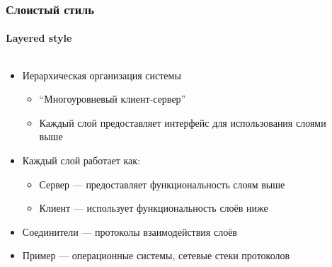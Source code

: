 \documentclass[xetex,mathserif,serif]{beamer}
\begin{document}
    \begin{frame}
        \frametitle{Слоистый стиль}
        \framesubtitle{Layered style}
        \begin{columns}
            \begin{column}{0.85\textwidth}
                \begin{itemize}
                    \item Иерархическая организация системы
                    \begin{itemize}
                        \item ``Многоуровневый клиент-сервер''
                        \item Каждый слой предоставляет интерфейс для использования слоями выше
                    \end{itemize}
                    \item Каждый слой работает как:
                    \begin{itemize}
                        \item Сервер --- предоставляет функциональность слоям выше
                        \item Клиент --- использует функциональность слоёв ниже
                    \end{itemize}
                    \item Соединители --- протоколы взаимодействия слоёв
                    \item Пример --- операционные системы, сетевые стеки протоколов
                \end{itemize}
            \end{column}
            \begin{column}{0.19\textwidth}
                \begin{center}

\end{center}
\end{column}
\end{columns}
\end{frame}
\end{document}
